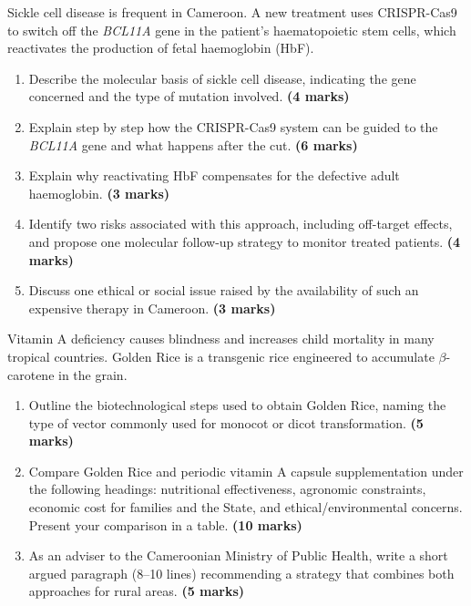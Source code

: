 \documentclass[11pt]{article}
\begin{document}
\begin{exercice}
Sickle cell disease is frequent in Cameroon. A new treatment uses CRISPR-Cas9 to switch off the \emph{BCL11A} gene in the patient's haematopoietic stem cells, which reactivates the production of fetal haemoglobin (HbF).
\begin{enumerate}
\item Describe the molecular basis of sickle cell disease, indicating the gene concerned and the type of mutation involved. \textbf{(4 marks)}
\item Explain step by step how the CRISPR-Cas9 system can be guided to the \emph{BCL11A} gene and what happens after the cut. \textbf{(6 marks)}
\item Explain why reactivating HbF compensates for the defective adult haemoglobin. \textbf{(3 marks)}
\item Identify two risks associated with this approach, including off-target effects, and propose one molecular follow-up strategy to monitor treated patients. \textbf{(4 marks)}
\item Discuss one ethical or social issue raised by the availability of such an expensive therapy in Cameroon. \textbf{(3 marks)}
\end{enumerate}
\end{exercice}

\begin{exercice}
Vitamin A deficiency causes blindness and increases child mortality in many tropical countries. Golden Rice is a transgenic rice engineered to accumulate $\beta$-carotene in the grain.
\begin{enumerate}
\item Outline the biotechnological steps used to obtain Golden Rice, naming the type of vector commonly used for monocot or dicot transformation. \textbf{(5 marks)}
\item Compare Golden Rice and periodic vitamin A capsule supplementation under the following headings: nutritional effectiveness, agronomic constraints, economic cost for families and the State, and ethical/environmental concerns. Present your comparison in a table. \textbf{(10 marks)}
\item As an adviser to the Cameroonian Ministry of Public Health, write a short argued paragraph (8--10 lines) recommending a strategy that combines both approaches for rural areas. \textbf{(5 marks)}
\end{enumerate}
\end{exercice}
\end{document}
